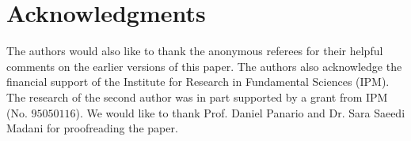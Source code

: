 \documentclass[journal,draftclsnofoot,onecolumn,12pt,twoside]{IEEEtran}
\begin{document}



\section*{Acknowledgments}
The authors would also like to thank the anonymous referees for their helpful comments on the earlier versions of this paper. The authors also acknowledge the financial support of the Institute for Research in Fundamental Sciences (IPM). The research of the second author was in part supported by a grant from IPM (No. $95050116$). We would like to thank  Prof. Daniel Panario and Dr. Sara Saeedi Madani for proofreading the paper.
\end{document}
